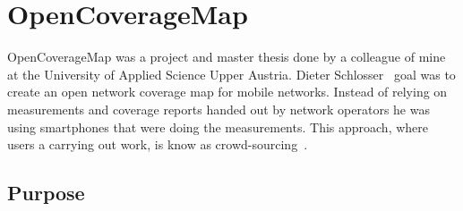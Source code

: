 \documentclass[master,english]{hgbthesis}
\begin{document}









\section{OpenCoverageMap}

OpenCoverageMap was a project and  master thesis done by a colleague of mine at the University of Applied Science Upper Austria. Dieter Schlosser~\cite{Schlosser2012} goal was to create an open network coverage map for mobile networks. Instead of relying on measurements and coverage reports handed out by network operators he was using smartphones that were doing the measurements. This approach, where users a carrying out work, is know as crowd-sourcing~\cite{Surowiecki2004}.

\subsection{Purpose}
\end{document}
